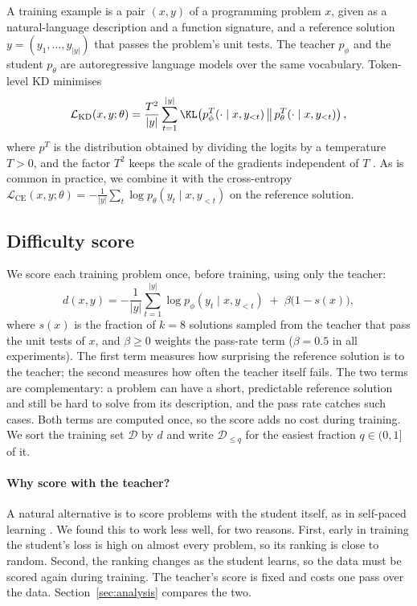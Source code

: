 \documentclass{article} %
\begin{document}
A training example is a pair $(x, y)$ of a programming problem $x$, given as a natural-language description and a function signature, and a reference solution $y = (y_1, \dots, y_{|y|})$ that passes the problem's unit tests.
The teacher $p_\phi$ and the student $p_\theta$ are autoregressive language models over the same vocabulary.
Token-level KD minimises
\begin{equation}
\mathcal{L}_{\mathrm{KD}}(x, y; \theta) = \frac{T^2}{|y|} \sum_{t=1}^{|y|} \KL\!\left( p_\phi^{T}(\cdot \mid x, y_{<t}) \,\big\|\, p_\theta^{T}(\cdot \mid x, y_{<t}) \right),
\label{eq:kd}
\end{equation}
where $p^{T}$ is the distribution obtained by dividing the logits by a temperature $T > 0$, and the factor $T^2$ keeps the scale of the gradients independent of $T$ \citep{hinton2015distilling}.
As is common in practice, we combine it with the cross-entropy $\mathcal{L}_{\mathrm{CE}}(x, y; \theta) = -\frac{1}{|y|} \sum_{t} \log p_\theta(y_t \mid x, y_{<t})$ on the reference solution.

\subsection{Difficulty score}
\label{sec:score}

We score each training problem once, before training, using only the teacher:
\begin{equation}
d(x, y) = -\frac{1}{|y|} \sum_{t=1}^{|y|} \log p_\phi(y_t \mid x, y_{<t}) \;+\; \beta \bigl(1 - s(x)\bigr),
\label{eq:difficulty}
\end{equation}
where $s(x)$ is the fraction of $k = 8$ solutions sampled from the teacher that pass the unit tests of $x$, and $\beta \ge 0$ weights the pass-rate term ($\beta = 0.5$ in all experiments). %
The first term measures how surprising the reference solution is to the teacher; the second measures how often the teacher itself fails.
The two terms are complementary: a problem can have a short, predictable reference solution and still be hard to solve from its description, and the pass rate catches such cases.
Both terms are computed once, so the score adds no cost during training.
We sort the training set $\mathcal{D}$ by $d$ and write $\mathcal{D}_{\le q}$ for the easiest fraction $q \in (0, 1]$ of it.

\paragraph{Why score with the teacher?}
A natural alternative is to score problems with the student itself, as in self-paced learning \citep{kumar2010selfpaced}.
We found this to work less well, for two reasons.
First, early in training the student's loss is high on almost every problem, so its ranking is close to random.
Second, the ranking changes as the student learns, so the data must be scored again during training.
The teacher's score is fixed and costs one pass over the data.
Section~\ref{sec:analysis} compares the two.
\end{document}
